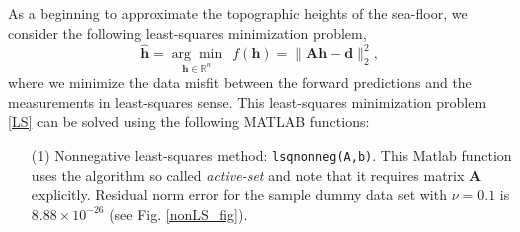 As a beginning to approximate the topographic heights of the sea-floor,  we consider the following least-squares minimization problem,
\begin{equation}\label{LS}
\mathbf{\hat{h}}= \underset{\mathbf{h} \in \mathbb{R}^n}{\arg \min} \ \ f(\mathbf{h}) = \|  \mathbf{A}\mathbf{h} -  \mathbf{d} \|_2^2,
\end{equation}
where we minimize the data misfit between the forward predictions and the measurements in least-squares sense. 
This least-squares minimization problem \eqref{LS} can be solved using the following  MATLAB functions:
\begin{itemize}
\item[(1)]  Nonnegative least-squares method:  \verb|lsqnonneg(A,b)|. This Matlab function uses the algorithm so called \textit{active-set} and note that it requires matrix $\mathbf{A}$ explicitly. Residual norm error for the sample dummy data set  with $\nu = 0.1$ is $8.88 \times 10^{-26}$ (see Fig. \ref{nonLS_fig}).   \\


\end{itemize}
